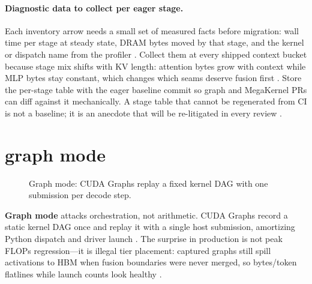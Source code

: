 \paragraph{Diagnostic data to collect per eager stage.}
Each inventory arrow needs a small set of measured facts before migration: wall time per stage at steady state, DRAM bytes moved by that stage, and the kernel or dispatch name from the profiler \citep{patel2025llminference,memoryfloor2026,taxbreak2026}. Collect them at every shipped context bucket because stage mix shifts with KV length: attention bytes grow with context while MLP bytes stay constant, which changes which seams deserve fusion first \citep{dao2023flashdecoding,kwon2023vllm}. Store the per-stage table with the eager baseline commit so graph and MegaKernel PRs can diff against it mechanically. A stage table that cannot be regenerated from CI is not a baseline; it is an anecdote that will be re-litigated in every review \citep{yirage2026,chen2020compilerbasedhardw,memoryfloor2026}.

\section{graph mode}
\label{sec:ch12_graph_mode}


\begin{figure}[t]
\centering
{}
\caption{Graph mode: CUDA Graphs replay a fixed kernel DAG with one submission per decode step.}
\label{fig:graph_mode_architecture}
\end{figure}

\textbf{Graph mode} attacks orchestration, not arithmetic. CUDA Graphs record a static kernel DAG once and replay it with a single host submission, amortizing Python dispatch and driver launch \citep{nvidia2024cudagraphs,memoryfloor2026}. The surprise in production is not peak FLOPs regression---it is illegal tier placement: captured graphs still spill activations to HBM when fusion boundaries were never merged, so bytes/token flatlines while launch counts look healthy \citep{memoryfloor2026,taxbreak2026,patel2025llminference}.

